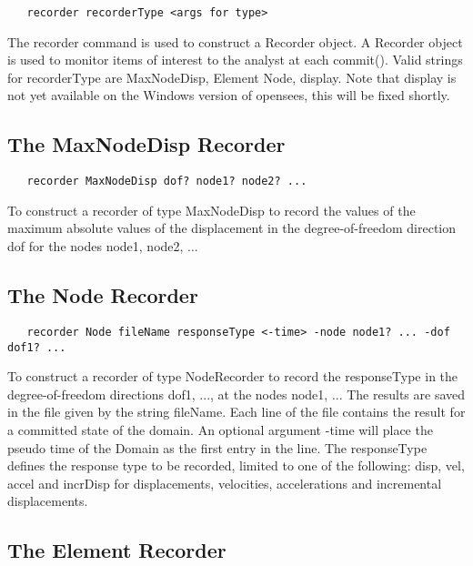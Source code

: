 \documentclass[12pt]{article}
\begin{document}
{\sf\small
\begin{verbatim}
   recorder recorderType <args for type>
\end{verbatim}
}

The recorder command is used to construct a Recorder object. A
Recorder object is used to monitor items of interest to the analyst at
each commit(). Valid strings for recorderType are MaxNodeDisp, Element
Node, display. Note that display is not yet available on the
Windows version of opensees, this will be fixed shortly.

\subsection{The MaxNodeDisp Recorder}

{\sf\small
\begin{verbatim}
   recorder MaxNodeDisp dof? node1? node2? ...
\end{verbatim}
}

\noindent To construct a recorder of type MaxNodeDisp to record the values of
the maximum absolute values of the displacement in the
degree-of-freedom direction dof for the nodes node1, node2, ...

\subsection{The Node Recorder}

{\sf\small
\begin{verbatim}
   recorder Node fileName responseType <-time> -node node1? ... -dof dof1? ...
\end{verbatim}
}

\noindent To construct a recorder of type NodeRecorder to record the 
responseType in the degree-of-freedom directions dof1, ..., at
the nodes node1, ... The results are saved in the file given
by the string fileName. Each line of the file contains the result for
a committed state of the domain. An optional argument -time will place
the pseudo time of the Domain as the first entry in the line. The
responseType defines the response type to be recorded, limited to one
of the following: disp, vel, accel and incrDisp for displacements,
velocities, accelerations and incremental displacements. 

\subsection{The Element Recorder}
\end{document}
